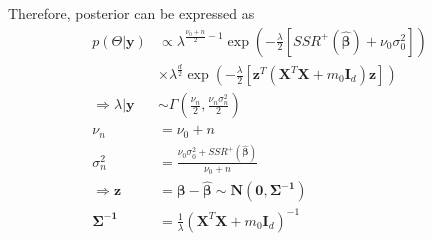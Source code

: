   Therefore, posterior can be expressed as
  \begin{align*}
      p(\Theta|\mathbf{y})
      &\propto \lambda^{\frac{\nu_0+n}{2}-1}\exp\left(
          -\frac{\lambda}{2}\left[
              SSR^+(\mathbf{\hat{\beta}}) + \nu_0\sigma_0^2
          \right]
          \right)\\
      &\times \lambda^{\frac{d}{2}}\exp\left(
          -\frac{\lambda}{2}\left[
              \mathbf{z}^T(\mathbf{X}^T\mathbf{X}+m_0\mathbf{I}_d)\mathbf{z}
          \right]
      \right)\\
      \Rightarrow \lambda|\mathbf{y} &\sim \Gamma\left(
          \frac{\nu_n}{2}, \frac{\nu_n\sigma_n^2}{2}
      \right)\\
          \nu_n &= \nu_0 + n\\
          \sigma_n^2 &=
          \frac{\nu_0\sigma_0^2+SSR^+(\mathbf{\hat{\beta}})}
          {\nu_0 + n}\\
          \Rightarrow \mathbf{z} &= \mathbf{\beta} -
          \mathbf{\hat{\beta}} \sim \mathbf{N(0,
          \Sigma^{-1})}\\
          \mathbf{\Sigma^{-1}} &=
          \frac{1}{\lambda}(\mathbf{X}^T\mathbf{X}+m_0\mathbf{I}_d)^{-1}
  \end{align*}
